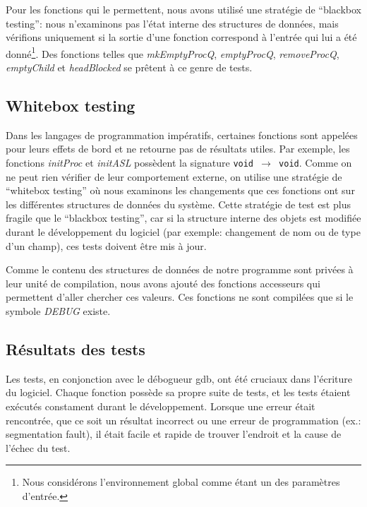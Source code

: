 \documentclass[10pt]{article}
\begin{document}
Pour les fonctions qui le permettent, nous avons utilisé une stratégie
de ``blackbox testing'': nous n'examinons pas l'état interne des
structures de données, mais vérifions uniquement si la sortie d'une
fonction correspond à l'entrée qui lui a été donné\footnote{Nous
  considérons l'environnement global comme étant un des paramètres
  d'entrée.}.  Des fonctions telles que \emph{mkEmptyProcQ},
\emph{emptyProcQ}, \emph{removeProcQ}, \emph{emptyChild} et
\emph{headBlocked} se prêtent à ce genre de tests.

\subsection{Whitebox testing}

Dans les langages de programmation impératifs, certaines fonctions
sont appelées pour leurs effets de bord et ne retourne pas de
résultats utiles.  Par exemple, les fonctions \emph{initProc} et
\emph{initASL} possèdent la signature {\tt void $\to$ void}.  Comme on
ne peut rien vérifier de leur comportement externe, on utilise une
stratégie de ``whitebox testing'' où nous examinons les changements
que ces fonctions ont sur les différentes structures de données du
système.  Cette stratégie de test est plus fragile que le ``blackbox
testing'', car si la structure interne des objets est modifiée durant
le développement du logiciel (par exemple: changement de nom ou de
type d'un champ), ces tests doivent être mis à jour.

Comme le contenu des structures de données de notre programme sont
privées à leur unité de compilation, nous avons ajouté des fonctions
accesseurs qui permettent d'aller chercher ces valeurs.  Ces fonctions
ne sont compilées que si le symbole \emph{DEBUG} existe.

\subsection{Résultats des tests}

Les tests, en conjonction avec le débogueur gdb, ont été cruciaux dans
l'écriture du logiciel.  Chaque fonction possède sa propre suite de
tests, et les tests étaient exécutés constament durant le
développement.  Lorsque une erreur était rencontrée, que ce soit un
résultat incorrect ou une erreur de programmation (ex.: segmentation
fault), il était facile et rapide de trouver l'endroit et la cause de
l'échec du test.
\end{document}
